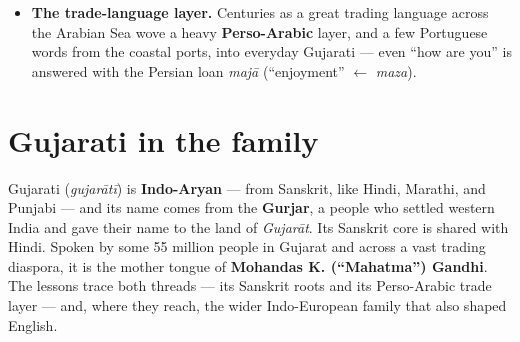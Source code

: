 \begin{itemize}
  \item \textbf{The trade-language layer.} Centuries as a great trading language across the Arabian Sea wove a heavy \textbf{Perso-Arabic} layer, and a few Portuguese words from the coastal ports, into everyday Gujarati — even \textquotedblleft{}how are you\textquotedblright{} is answered with the Persian loan \emph{majā} (\textquotedblleft{}enjoyment\textquotedblright{} $\leftarrow$ \emph{maza}).
\end{itemize}

\section*{Gujarati in the family}

Gujarati (\emph{gujarātī}) is \textbf{Indo-Aryan} — from Sanskrit, like Hindi, Marathi, and Punjabi — and its name comes from the \textbf{Gurjar}, a people who settled western India and gave their name to the land of \emph{Gujarāt}. Its Sanskrit core is shared with Hindi. Spoken by some 55 million people in Gujarat and across a vast trading diaspora, it is the mother tongue of \textbf{Mohandas K. (\textquotedblleft{}Mahatma\textquotedblright{}) Gandhi}. The lessons trace both threads — its Sanskrit roots and its Perso-Arabic trade layer — and, where they reach, the wider Indo-European family that also shaped English.
